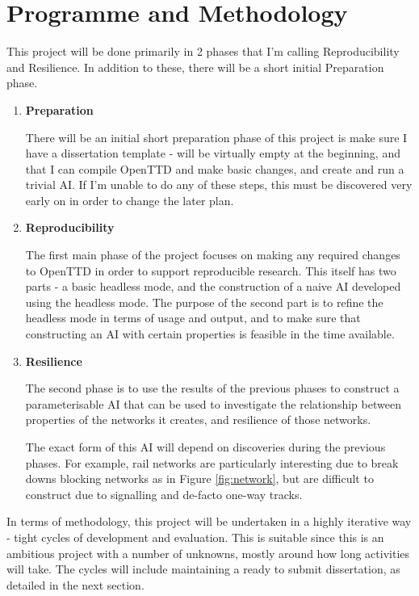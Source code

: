 \documentclass[a4paper,11pt]{article}
\begin{document}
\section{Programme and Methodology}

This project will be done primarily in 2 phases that I'm calling Reproducibility and Resilience. In addition to these, there will be a short initial Preparation phase.

\begin{enumerate}
\addtocounter{enumi}{-1}
    \item \textbf{Preparation}

    There will be an initial short preparation phase of this project is make sure I have a dissertation template - will be virtually empty at the beginning, and that I can compile OpenTTD and make basic changes, and create and run a trivial AI. If I'm unable to do any of these steps, this must be discovered very early on in order to change the later plan.
    
    \item \textbf{Reproducibility}

    The first main phase of the project focuses on making any required changes to OpenTTD in order to support reproducible research. This itself has two parts - a basic headless mode, and the construction of a naive AI developed using the headless mode. The purpose of the second part is to refine the headless mode in terms of usage and output, and to make sure that constructing an AI with certain properties is feasible in the time available.
    
    \item \textbf{Resilience}

    The second phase is to use the results of the previous phases to construct a parameterisable AI that can be used to investigate the relationship between properties of the networks it creates, and resilience of those networks.

    The exact form of this AI will depend on discoveries during the previous phases. For example, rail networks are particularly interesting due to break downs blocking networks as in Figure \ref{fig:network}, but are  difficult to construct due to signalling and de-facto one-way tracks.
    
\end{enumerate}

In terms of methodology, this project will be undertaken in a highly iterative way - tight cycles of development and evaluation. This is suitable since this is an ambitious project with a number of unknowns, mostly around how long activities will take. The cycles will include maintaining a ready to submit dissertation, as detailed in the next section.
\end{document}
